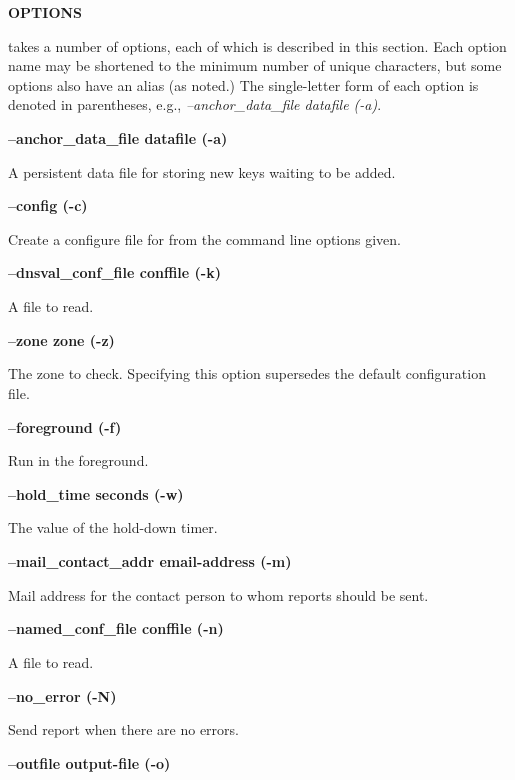 {\bf OPTIONS}

 takes a number of options, each of which is described in this
section.  Each option name may be shortened to the minimum number of unique
characters, but some options also have an alias (as noted.)  The single-letter
form of each option is denoted in parentheses, e.g.,
{\it --anchor\_data\_file datafile (-a)}.

\begin{description}

\item {\bf --anchor\_data\_file datafile (-a)}\verb" "

A persistent data file for storing new keys waiting to be added.

\item {\bf --config (-c)}\verb" "

Create a configure file for  from the command line options given.

\item {\bf --dnsval\_conf\_file conffile (-k)}\verb" "

A  file to read.

\item {\bf --zone zone (-z)}\verb" "

The zone to check.  Specifying this option supersedes the default
configuration file.

\item {\bf --foreground (-f)}\verb" "

Run in the foreground.

\item {\bf --hold\_time seconds (-w)}\verb" "

The value of the hold-down timer.

\item {\bf --mail\_contact\_addr email-address (-m)}\verb" "

Mail address for the contact person to whom reports should be sent.

\item {\bf --named\_conf\_file conffile (-n)}\verb" "

A  file to read.

\item {\bf --no\_error (-N)}\verb" "

Send report when there are no errors.

\item {\bf --outfile output-file (-o)}\verb" "


\end{description}
